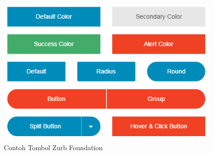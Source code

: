 \begin{enumerate}[(1)]
\begin{figure}[H]
\centering
\includegraphics[scale=0.7]{Gambar/button.png}
\caption[Contoh Tombol Zurb Foundation]{Contoh Tombol Zurb Foundation}
\label{fig:button}
\end{figure}


\end{enumerate}

